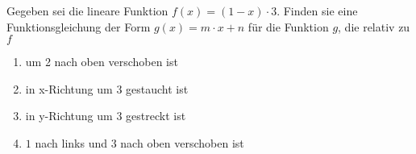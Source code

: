 \item Gegeben sei die lineare Funktion $f(x)=(1-x)\cdot 3$. Finden sie eine Funktionsgleichung der Form $g(x)=m\cdot x+n$ für die Funktion $g$, die relativ zu $f$

\begin{multicols}{2}

\begin{enumerate}
\item um 2 nach oben verschoben ist
\item in x-Richtung um $3$ gestaucht ist
\item in y-Richtung um $3$ gestreckt ist
\item $1$ nach links und $3$ nach oben verschoben ist  
\end{enumerate}

\end{multicols}

